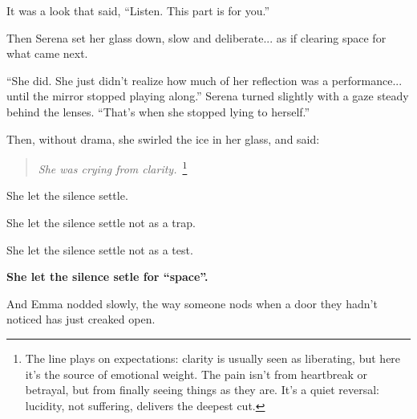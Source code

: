 It was a look that said, ``Listen. This part is for you.''

Then Serena set her glass down, slow and deliberate... as if clearing space for what came next.

``She did. She just didn’t realize how much of her reflection was a performance... until the mirror 
stopped playing along.'' Serena turned slightly with a gaze steady behind the lenses. ``That’s when 
she stopped lying to herself.''

Then, without drama, she swirled the ice in her glass, and said:

\begin{quote}
\centering
\textit{She was crying from clarity.}\ 
\footnote{The line plays on
expectations: clarity is usually seen as liberating, but here it’s the source of emotional weight. The pain
isn't from heartbreak or betrayal, but from finally seeing things as they are. It's a quiet reversal: lucidity,
not suffering, delivers the deepest cut.}
\end{quote}

She let the silence settle. 

She let the silence settle not as a trap.  

She let the silence settle not as a test. 

\textbf{She let the silence setle for ``space''.} 

And Emma nodded slowly, the way someone nods when a door they hadn’t noticed has just creaked open.

